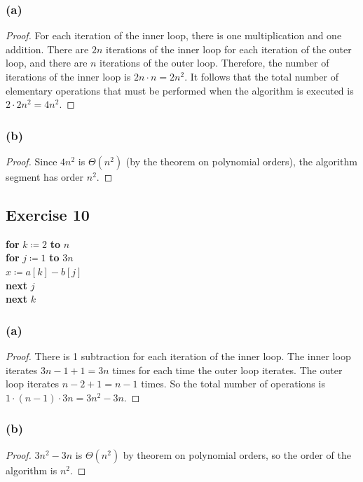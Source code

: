 \documentclass[14pt]{extarticle}
\begin{document}
\subsubsection{(a)}
\begin{proof}
    For each iteration of the inner loop, there is one multiplication and one addition. There are \(2n\) iterations
    of the inner loop for each iteration of the outer loop, and there are \(n\) iterations of the outer loop. Therefore, the
    number of iterations of the inner loop is \(2n \cdot n = 2n^2\). It follows that the total number of elementary
    operations that must be performed when the algorithm is executed is \(2 \cdot 2n^2 = 4n^2\).
\end{proof}

\subsubsection{(b)}
\begin{proof}
    Since \(4n^2\) is \(\Theta(n^2)\) (by the theorem on polynomial orders), the algorithm segment has order \(n^2\).
\end{proof}

\subsection{Exercise 10}
\begin{tabbing}
    {\bf for} \= \(k \coloneqq 2\) {\bf to} \(n\) \\
    \> {\bf for} \= \(j \coloneqq 1\) {\bf to} \(3n\) \\
    \>           \> \(x \coloneqq a[k] - b[j]\) \\
    \> {\bf next} \(j\) \\
    {\bf next} \(k\)
\end{tabbing}

\subsubsection{(a)}
\begin{proof}
    There is 1 subtraction for each iteration of the inner loop. The inner loop iterates \(3n-1+1 = 3n\) times for each time
    the outer loop iterates. The outer loop iterates \(n-2+1 = n-1\) times. So the total number of operations is
    \(1 \cdot (n-1) \cdot 3n = 3n^2 - 3n\).
\end{proof}

\subsubsection{(b)}
\begin{proof}
    \(3n^2 - 3n\) is \(\Theta(n^2)\) by theorem on polynomial orders, so the order of the algorithm is \(n^2\).
\end{proof}
\end{document}
